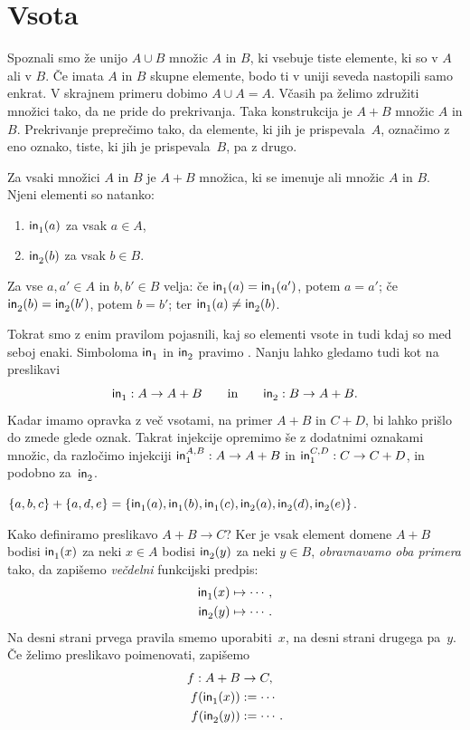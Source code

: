 \section{Vsota}
\label{sec:vsota}

Spoznali smo že unijo $A \cup B$ množic $A$ in $B$, ki vsebuje tiste elemente, ki so v $A$
ali v $B$. Če imata $A$ in $B$ skupne elemente, bodo ti v uniji seveda nastopili samo
enkrat. V skrajnem primeru dobimo $A \cup A = A$. Včasih pa želimo združiti množici tako,
da ne pride do prekrivanja. Taka konstrukcija je  $A + B$ množic $A$ in $B$.
Prekrivanje preprečimo tako, da elemente, ki jih je prispevala~$A$, označimo z eno oznako,
tiste, ki jih je prispevala~$B$, pa z drugo.

\begin{pravilo}
  \label{vsota:tvorba}
  Za vsaki množici $A$ in $B$ je $A + B$ množica, ki se imenuje  ali
   množic $A$ in $B$.
  Njeni elementi so natanko:
  \begin{enumerate}
  \item $\inl(a)$ za vsak $a \in A$,
  \item $\inr(b)$ za vsak $b \in B$.
  \end{enumerate}
  Za vse $a, a' \in A$ in $b, b' \in B$ velja:
  če $\inl(a) = \inl(a')$, potem $a = a'$; če $\inr(b) = \inr(b')$, potem $b = b'$; ter $\inl(a) \neq \inr(b)$.
\end{pravilo}

Tokrat smo z enim pravilom pojasnili, kaj so elementi vsote in tudi kdaj so med seboj enaki.
%
Simboloma $\inl$ in $\inr$ pravimo . Nanju lahko gledamo tudi kot na preslikavi
%
\begin{equation*}
  \inl : A \to A + B
  \qquad\text{in}\qquad
  \inr : B \to A + B.
\end{equation*}
%
Kadar imamo opravka z več vsotami, na primer $A + B$ in $C + D$, bi lahko prišlo do
zmede glede oznak. Takrat injekcije opremimo še z dodatnimi oznakami množic, da razločimo
injekciji $\inl[A][B] : A \to A + B$ in $\inl[C][D] : C \to C + D$, in podobno za~$\inr$.

\begin{zgled}
%
$
\set{a, b, c} + \set{a, d, e} =
\set{\inl(a), \inl(b), \inl(c), \inr(a), \inr(d), \inr(e)}
$.
\end{zgled}

Kako definiramo preslikavo $A + B \to C$? Ker je vsak element domene $A + B$ bodisi
$\inl(x)$ za neki $x \in A$ bodisi $\inr(y)$ za neki $y \in B$, \emph{obravnavamo oba
  primera} tako, da zapišemo \emph{večdelni} funkcijski predpis:
%
\begin{align*}
  \inl(x) &\mapsto \cdots, \\
  \inr(y) &\mapsto \cdots.
\end{align*}
%
Na desni strani prvega pravila smemo uporabiti~$x$, na desni strani drugega pa~$y$.
Če želimo preslikavo poimenovati, zapišemo
%
\begin{align*}
  f : A + B &\to C, \\
  f(\inl(x)) &\defeq \cdots\\
  f(\inr(y)) &\defeq \cdots.
\end{align*}

